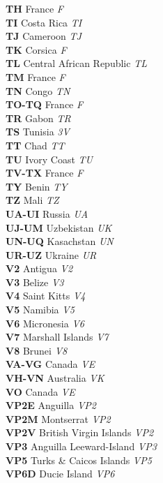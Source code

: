 \documentclass[landscape,a4paper]{article}
\begin{document}
\begin{multicols}{7}
\textbf{TH} France \emph{F} \\
\textbf{TI} Costa Rica \emph{TI} \\
\textbf{TJ} Cameroon \emph{TJ} \\
\textbf{TK} Corsica \emph{F} \\
\textbf{TL} Central African Republic \emph{TL} \\
\textbf{TM} France \emph{F} \\
\textbf{TN} Congo \emph{TN} \\
\textbf{TO-TQ} France \emph{F} \\
\textbf{TR} Gabon \emph{TR} \\
\textbf{TS} Tunisia \emph{3V} \\
\textbf{TT} Chad \emph{TT} \\
\textbf{TU} Ivory Coast \emph{TU} \\
\textbf{TV-TX} France \emph{F} \\
\textbf{TY} Benin \emph{TY} \\
\textbf{TZ} Mali \emph{TZ} \\
\textbf{UA-UI} Russia \emph{UA} \\
\textbf{UJ-UM} Uzbekistan \emph{UK} \\
\textbf{UN-UQ} Kasachstan \emph{UN} \\
\textbf{UR-UZ} Ukraine \emph{UR} \\
\textbf{V2} Antigua \emph{V2} \\
\textbf{V3} Belize \emph{V3} \\
\textbf{V4} Saint Kitts \emph{V4} \\
\textbf{V5} Namibia \emph{V5} \\
\textbf{V6} Micronesia \emph{V6} \\
\textbf{V7} Marshall Islands \emph{V7} \\
\textbf{V8} Brunei \emph{V8} \\
\textbf{VA-VG} Canada \emph{VE} \\
\textbf{VH-VN} Australia \emph{VK} \\
\textbf{VO} Canada \emph{VE} \\
\textbf{VP2E} Anguilla \emph{VP2} \\
\textbf{VP2M} Montserrat \emph{VP2} \\
\textbf{VP2V} British Virgin Islands \emph{VP2} \\
\textbf{VP3} Anguilla Leeward-Island \emph{VP3} \\
\textbf{VP5} Turks \& Caicos Islands \emph{VP5} \\
\textbf{VP6D} Ducie Island \emph{VP6} \\

\end{multicols}
\end{document}
